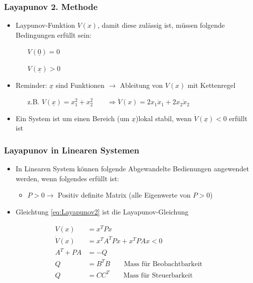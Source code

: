 \subsubsection{Layapunov 2. Methode}
\begin{itemize}
	\item Laypunov-Funktion $V(x)$, damit diese zulässig ist, müssen folgende Bedingungen erfüllt sein:
	\begin{itemize}
		\item []$V\left(\underline{0}\right) = 0$
		\item []$V\left(\underline{x}\right) > 0$
	\end{itemize}	
	\item Reminder: $\underline{x}$ sind Funktionen $\rightarrow$ Ableitung von $V(x)$ mit Kettenregel
	\begin{itemize}
		\item [z.B.] $V(\underline{x}) = x_1^2+x_2^2 \qquad\Rightarrow \dot{V}(x) = 2x_1\dot{x}_1 + 2x_2\dot{x}_2$
	\end{itemize}
	\item Ein System ist um einen Bereich (um $\underline{x}$)lokal stabil, wenn $\dot{V}\left(\underline{x}\right) < 0$ erfüllt ist 
\end{itemize}

\subsubsection{Layapunov in Linearen Systemen}
\begin{itemize}
	\item In Linearen System können folgende Abgewandelte Bedienungen angewendet werden, wenn folgendes erfüllt ist:
	\begin{itemize}
		\item $P>0 \rightarrow$ Positiv definite Matrix (alle Eigenwerte von $P>0$)
	\end{itemize}
	\item Gleichtung \ref{eq:Layapunov2} ist die Layapunov-Gleichung
\end{itemize}
\begin{align}
	V(x) &=x^TPx\\
	\dot{V}(x) &= x^TA^TPx+x^TPAx < 0\\
	\label{eq:Layapunov2}
	A^T+PA&=-Q\\
	Q&=B^TB	\qquad \text{Mass für Beobachtbarkeit}\\
	Q&=CC^T	\qquad	\text{Mass für Steuerbarkeit}
\end{align}

